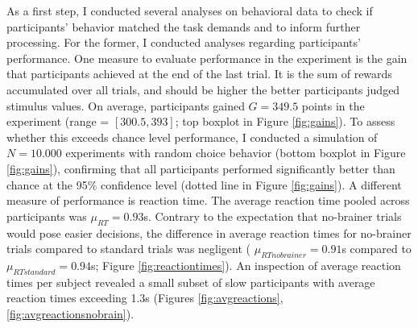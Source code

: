 As a first step, I conducted several analyses on behavioral data to check if participants' behavior matched the task demands and to inform further processing.
For the former, I conducted analyses regarding participants' performance.
One measure to evaluate performance in the experiment is the gain that participants achieved at the end of the last trial.
It is the sum of rewards accumulated over all trials, and should be higher the better participants judged stimulus values.
On average, participants gained $G=349.5$ points in the experiment (range = $[300.5, 393]$; top boxplot in Figure \ref{fig:gains}).
To assess whether this exceeds chance level performance, I conducted a simulation of $N=10.000$ experiments with random choice behavior (bottom boxplot in Figure \ref{fig:gains}), confirming that all participants performed significantly better than chance at the 95\% confidence level (dotted line in Figure \ref{fig:gains}).
A different measure of performance is reaction time.
The average reaction time pooled across participants was $\mu_{RT}=0.93$s.
Contrary to the expectation that no-brainer trials would pose easier decisions, the difference in average reaction times for no-brainer trials compared to standard trials was negligent ( $\mu_{RTnobrainer}=0.91$s compared to  $\mu_{RTstandard}=0.94$s; Figure \ref{fig:reactiontimes}).
An inspection of average reaction times per subject revealed a small subset of slow participants with average reaction times exceeding 1.3s (Figures \ref{fig:avgreactions}, \ref{fig:avgreactionsnobrain}).


